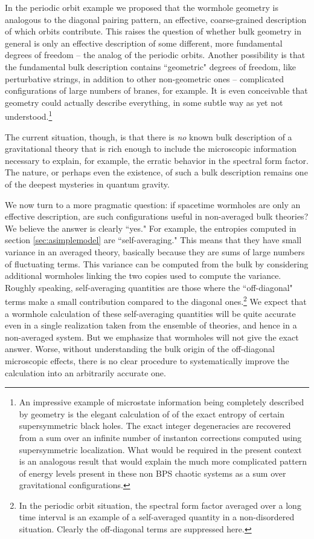 \documentclass[12pt]{article}
\numberwithin{equation}{section}
\begin{document}
In the periodic orbit example we proposed that the wormhole geometry is  analogous  to the diagonal pairing pattern, an effective, coarse-grained description of which orbits contribute.   This raises the question of whether bulk geometry in general is only an effective description of some different, more fundamental degrees of freedom -- the analog of the periodic orbits.   Another possibility is that the fundamental bulk description contains ``geometric" degrees of freedom, like perturbative strings, in addition to other non-geometric ones -- complicated configurations of large numbers of branes, for example.  It is even conceivable that geometry could actually describe everything, in some subtle way as yet not understood.\footnote{An impressive example of microstate information being completely  described by geometry is the elegant calculation of \cite{Dabholkar:2014ema}  of the exact entropy of certain supersymmetric black holes.  The exact integer degeneracies are recovered from a sum over an infinite number of instanton corrections computed using supersymmetric localization.    What would be required in the present context is an analogous result that would explain the much more complicated pattern of energy levels present in these non BPS chaotic systems as a sum over gravitational configurations.}   
 
 The current situation, though,  is that there is \emph{no} known  bulk description of a gravitational theory that is  rich enough to include the microscopic information necessary to explain, for example,  the erratic behavior in the spectral form factor.   The nature, or perhaps even the existence, of such a bulk description remains one of the deepest mysteries in quantum gravity.

We now turn to a more pragmatic question:  if  spacetime wormholes are only an effective description, are such  configurations useful in non-averaged bulk theories?  We believe the answer is clearly ``yes."      For example, the entropies computed in  section \ref{sec:asimplemodel} are ``self-averaging."  This means that they  have small variance in an averaged theory,  basically because they are sums of large numbers of fluctuating terms.  This variance can be computed from the bulk by considering additional wormholes linking the two copies used to compute the variance.    Roughly speaking, 
self-averaging quantities are those  where the ``off-diagonal" terms make a small contribution compared to the diagonal ones.\footnote{In the periodic orbit situation, the spectral form factor averaged over a long time interval is an example of a self-averaged quantity in a non-disordered situation. Clearly the off-diagonal terms are suppressed here.} We expect that a wormhole calculation of these self-averaging quantities will be quite accurate even in a single realization taken from  the ensemble of theories, and hence in a non-averaged system.    But we emphasize that wormholes will not give the exact answer.  Worse, without understanding the bulk origin of the off-diagonal microscopic effects, there is no clear procedure to systematically  improve the calculation into an arbitrarily accurate one.   
\end{document}
